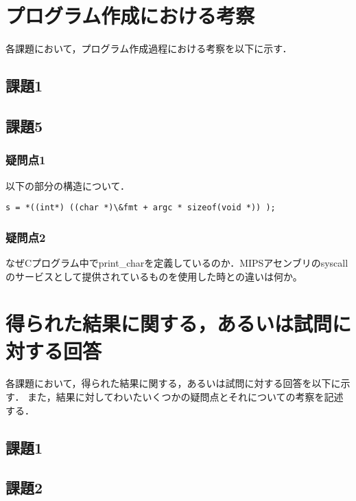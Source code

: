 \documentclass[a4j]{jarticle}
\begin{document}



%
%

\section{プログラム作成における考察}

各課題において，プログラム作成過程における考察を以下に示す．

\subsection{課題1}


\subsection{課題5}


\subsubsection{疑問点1}

以下の部分の構造について．

\begin{verbatim}
s = *((int*) ((char *)\&fmt + argc * sizeof(void *)) ); 
\end{verbatim}

\subsubsection{疑問点2}

なぜCプログラム中でprint\_charを定義しているのか．MIPSアセンブリのsyscallのサービスとして提供されているものを使用した時との違いは何か。




%
%

\section{得られた結果に関する，あるいは試問に対する回答}


各課題において，得られた結果に関する，あるいは試問に対する回答を以下に示す．
また，結果に対してわいたいくつかの疑問点とそれについての考察を記述する．


\subsection{課題1}
\subsection{課題2}
\end{document}
